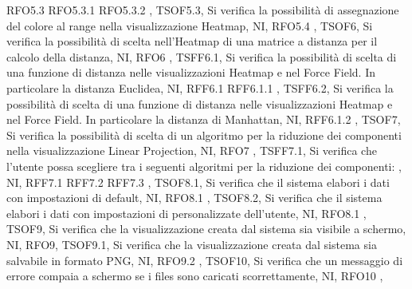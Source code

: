 {{        RFO5.3 RFO5.3.1 RFO5.3.2
    },
    {   
        TSOF5.3,
        Si verifica la possibilità di assegnazione del colore al range nella visualizzazione Heatmap,
        NI,
        RFO5.4
    },
    {   
        TSOF6,
        Si verifica la possibilità di scelta nell'Heatmap di una matrice a distanza per il calcolo della distanza,
        NI,
        RFO6
    },
    {   
        TSFF6.1,
        Si verifica la possibilità di scelta di una funzione di distanza nelle visualizzazioni Heatmap e nel Force Field. In particolare la distanza Euclidea,
        NI,
        RFF6.1 RFF6.1.1
    },
    {   
        TSFF6.2,
        Si verifica la possibilità di scelta di una funzione di distanza nelle visualizzazioni Heatmap e nel Force Field. In particolare la distanza di Manhattan,
        NI,
        RFF6.1.2
    },
    {   
        TSOF7,
        Si verifica la possibilità di scelta di un algoritmo per la riduzione dei componenti nella visualizzazione Linear Projection,
        NI,
        RFO7
    },
    {   
        TSFF7.1,
        Si verifica che l'utente possa scegliere tra i seguenti algoritmi per la riduzione dei componenti:
        ,
        NI,
        RFF7.1 RFF7.2 RFF7.3
    },
    {   
        TSOF8.1,
        Si verifica che il sistema elabori i dati con impostazioni di default,
        NI,
        RFO8.1
    },
    {   
        TSOF8.2,
        Si verifica che il sistema elabori i dati con impostazioni di personalizzate dell'utente,
        NI,
        RFO8.1
    },
    {   
        TSOF9,
        Si verifica che la visualizzazione creata dal sistema sia visibile a schermo,
        NI,
        RFO9},
    {   
        TSOF9.1,
        Si verifica che la visualizzazione creata dal sistema sia salvabile in formato PNG,
        NI,
        RFO9.2
    },
    {   
        TSOF10,
        Si verifica che un messaggio di errore compaia a schermo se i files sono caricati scorrettamente,
        NI,
        RFO10
    },
    }
    
    
